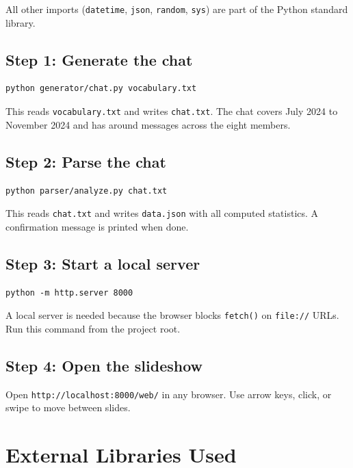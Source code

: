 \documentclass{article}
\begin{document}
All other imports (\texttt{datetime}, \texttt{json}, \texttt{random}, \texttt{sys}) are part of the Python standard library.

\subsection*{Step 1: Generate the chat}

\begin{verbatim}
python generator/chat.py vocabulary.txt
\end{verbatim}

This reads \texttt{vocabulary.txt} and writes \texttt{chat.txt}. The chat covers July 2024 to November 2024 and has around messages across the eight members.

\subsection*{Step 2: Parse the chat}

\begin{verbatim}
python parser/analyze.py chat.txt
\end{verbatim}

This reads \texttt{chat.txt} and writes \texttt{data.json} with all computed statistics. A confirmation message is printed when done.

\subsection*{Step 3: Start a local server}

\begin{verbatim}
python -m http.server 8000
\end{verbatim}

A local server is needed because the browser blocks \texttt{fetch()} on \texttt{file://} URLs. Run this command from the project root.

\subsection*{Step 4: Open the slideshow}

Open \texttt{http://localhost:8000/web/} in any browser. Use arrow keys, click, or swipe to move between slides.

\section{External Libraries Used}
\end{document}
